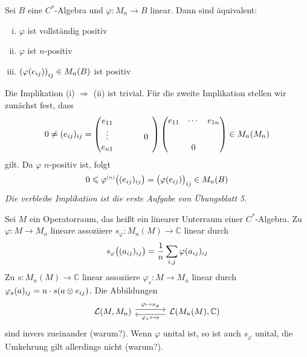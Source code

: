 \begin{satz}[label=satz:323]
	Sei $B$ eine $C^*$-Algebra und $\varphi \colon M_n \to B$ linear.
	Dann sind äquivalent:
	\begin{enumerate}[(i)]
		\item $\varphi$ ist vollständig positiv
		\item $\varphi$ ist $n$-positiv
		\item $\enbrace*{\varphi(e_{ij})}_{ij} \in M_n(B)$ ist positiv
	\end{enumerate}
\end{satz}
\begin{beweis}
	Die Implikation (i) $\Rightarrow $ (ii) ist trivial.
	Für die zweite Implikation stellen wir zunächst fest, dass
	\[
		0 \neq (e_{ij})_{ij} = \begin{pmatrix}
			e_{11} & \hphantom{\cdots} & \hphantom{e_{1n}}\\
			\vdots & & 0 \\
			e_{n1} & &
		\end{pmatrix} \begin{pmatrix}
			e_{11} & \cdots & e_{1n} \\
			\rule{0cm}{1.6em} & & \\
			& 0 &
		\end{pmatrix} \in M_n(M_n)
	\]
	gilt.
	Da $\varphi$ $n$-positiv ist, folgt
	\[
		0 \le \varphi^\ssbrace{n} \enbrace[\big]{(e_{ij})_{ij}} = \enbrace[\big]{\varphi(e_{ij})}_{ij} \in M_n(B)
	\]
	\textit{Die verbleibe Implikation ist die erste Aufgabe von Übungsblatt 5.}
\end{beweis}

\begin{bemerkung}[label=bem:324]
	Sei $M$ ein Operatorraum, das heißt ein linearer Unterraum einer $C^*$-Algebra.
	Zu $\varphi \colon M \to M_n$ lineare assoziiere $s_\varphi \colon M_n(M) \to \mathbb{C}$ linear durch
	\[
		s_\varphi\enbrace[\big]{(a_{ij})_{ij}} = \frac{1}{n} \sum_{i,j} \varphi(a_{ij})_{ij}
	\]
	Zu $s \colon M_n(M) \to \mathbb{C}$ linear assoziiere $\varphi_s \colon M \to M_n$ linear durch
	\(
		\varphi_s (a)_{ij} = n \cdot s \enbrace*{a \otimes e_{ij}}
	\).
	Die Abbildungen 
	\[
		\begin{tikzcd}[sep=large]
			\mathcal{L}(M,M_n) \rar["\varphi \mapsto s_\varphi",yshift=.7ex] & \mathcal{L} \enbrace*{M_n(M),\mathbb{C}} \lar["\varphi_s \reflectbox{$\mapsto$}s",yshift=-.7ex]
		\end{tikzcd}
	\]
	sind invers zueinander (warum?).
	Wenn $\varphi$ unital ist, so ist auch $s_\varphi$ unital, die Umkehrung gilt allerdings nicht (warum?).
\end{bemerkung}

